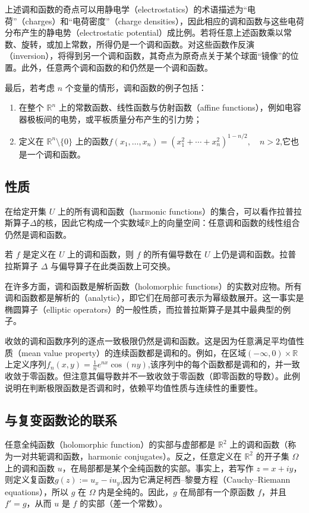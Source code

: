 上述调和函数的奇点可以用静电学（electrostatics）的术语描述为“电荷”（charges）和“电荷密度”（charge densities），因此相应的调和函数与这些电荷分布产生的静电势（electrostatic potential）成比例。若将任意上述函数乘以常数、旋转，或加上常数，所得仍是一个调和函数。对这些函数作反演（inversion），将得到另一个调和函数，其奇点为原奇点关于某个球面“镜像”的位置。此外，任意两个调和函数的和仍然是一个调和函数。

最后，若考虑 \(n\) 个变量的情形，调和函数的例子包括：
\begin{enumerate}
\item 在整个 \(\mathbb{R}^{n}\) 上的常数函数、线性函数与仿射函数（affine functions），例如电容器极板间的电势，或平板质量分布产生的引力势；
\item 定义在 \(\mathbb{R}^{n}\setminus\{0\}\) 上的函数$f(x_{1}, \dots, x_{n}) = \left(x_{1}^{2} + \cdots + x_{n}^{2}\right)^{1 - n/2}, \quad n > 2$,它也是一个调和函数。
\end{enumerate}
\subsection{性质}
在给定开集 \( U \) 上的所有调和函数（harmonic functions）的集合，可以看作拉普拉斯算子\(\Delta\)的核，因此它构成一个实数域\(\mathbb{R}\)上的向量空间：任意调和函数的线性组合仍然是调和函数。

若 \( f \) 是定义在 \( U \) 上的调和函数，则 \( f \) 的所有偏导数在 \( U \) 上仍是调和函数。拉普拉斯算子 \(\Delta\) 与偏导算子在此类函数上可交换。

在许多方面，调和函数是解析函数（holomorphic functions）的实数对应物。所有调和函数都是解析的（analytic），即它们在局部可表示为幂级数展开。这一事实是椭圆算子（elliptic operators）的一般性质，而拉普拉斯算子是其中最典型的例子。

收敛的调和函数序列的逐点一致极限仍然是调和函数。这是因为任意满足平均值性质（mean value property）的连续函数都是调和的。例如，在区域\((-\infty, 0) \times \mathbb{R}\)上定义序列$f_{n}(x,y) = \frac{1}{n} e^{nx} \cos(ny)$,该序列中的每个函数都是调和的，并一致收敛于零函数。但注意其偏导数并不一致收敛于零函数（即零函数的导数）。此例说明在判断极限函数是否调和时，依赖平均值性质与连续性的重要性。
\subsection{与复变函数论的联系}
任意全纯函数（holomorphic function）的实部与虚部都是 \(\mathbb{R}^2\) 上的调和函数（称为一对共轭调和函数，harmonic conjugates）。反之，任意定义在 \(\mathbb{R}^2\) 的开子集 \(\Omega\) 上的调和函数 \(u\)，在局部都是某个全纯函数的实部。事实上，若写作 \( z = x + i y \)，则定义复函数\(g(z) := u_x - i u_y\),因为它满足柯西–黎曼方程（Cauchy–Riemann equations），所以 \( g \) 在 \(\Omega\) 内是全纯的。因此，\( g \) 在局部有一个原函数 \( f \)，并且 \( f' = g \)，从而 \( u \) 是 \( f \) 的实部（差一个常数）。

